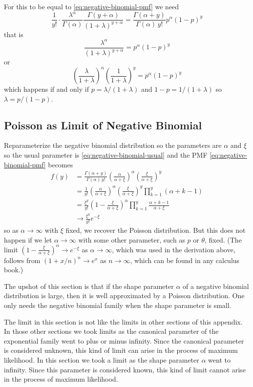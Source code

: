 For this to be equal to \eqref{eq:negative-binomial-pmf} we need
$$
   \frac{1}{y!}
   \cdot
   \frac{\lambda^\alpha}{\Gamma(\alpha)}
   \frac{\Gamma(y + \alpha)}{(1 + \lambda)^{y + \alpha}}
   =
   \frac{\Gamma(\alpha + y)}{\Gamma(\alpha) \, y!} p^\alpha (1-p)^y
$$
that is
$$
   \frac{\lambda^\alpha}{(1 + \lambda)^{y + \alpha}}
   =
   p^\alpha (1-p)^y
$$
or
$$
   \left(\frac{\lambda}{1 + \lambda}\right)^\alpha
   \left(\frac{1}{1 + \lambda}\right)^y
   =
   p^\alpha (1-p)^y
$$
which happens if and only if $p = \lambda / (1 + \lambda)$ and
$1 - p = 1 / (1 + \lambda)$ so $\lambda = p / (1 - p)$.

\subsection{Poisson as Limit of Negative Binomial}

Reparameterize the negative binomial distribution so the parameters
are $\alpha$ and $\xi$ so the usual parameter is
\eqref{eq:negative-binomial-usual}
and the PMF \eqref{eq:negative-binomial-pmf} becomes
\begin{align*}
   f(y)
   & =
   \frac{\Gamma(\alpha + y)}{\Gamma(\alpha) \, y!}
   \left(\frac{\alpha}{\alpha + \xi}\right)^\alpha
   \left(\frac{\xi}{\alpha + \xi}\right)^y
   \\
   & =
   \frac{1}{y!}
   \left(\frac{\alpha}{\alpha + \xi}\right)^\alpha
   \left(\frac{\xi}{\alpha + \xi}\right)^y
   \prod_{k = 1}^y (\alpha + k - 1)
   \\
   & =
   \frac{\xi^y}{y!}
   \left(1 - \frac{\xi}{\alpha + \xi}\right)^\alpha
   \prod_{k = 1}^y \frac{\alpha + k - 1}{\alpha + \xi}
   \\
   & \to
   \frac{\xi^y}{y!} e^{- \xi}
\end{align*}
so as $\alpha \to \infty$ with $\xi$ fixed, we recover the Poisson
distribution.  But this does not happen if we let $\alpha \to \infty$
with some other parameter, such as $p$ or $\theta$, fixed.
(The limit $\left(1 - \frac{\xi}{\alpha + \xi}\right)^\alpha \to e^{- \xi}$
as $\alpha \to \infty$, which was used in the derivation above, follows
from $(1 + x / n)^n \to e^x$ as $n \to \infty$, which can be found
in any calculus book.)

The upshot of this section is that if the shape parameter $\alpha$
of a negative binomial distribution is large, then it is well approximated
by a Poisson distribution.  One only needs the negative binomial family
when the shape parameter is small.

The limit in this section is not like the limits in other sections of
this appendix.  In those other sections we took limits as the canonical
parameter of the exponential family went to plus or minus infinity.
Since the canonical parameter is considered unknown, this kind of
limit can arise in the process of maximum likelihood.
In this section we took a limit as the shape parameter $\alpha$ went
to infinity.
Since this parameter is considered known, this kind of
limit cannot arise in the process of maximum likelihood.

